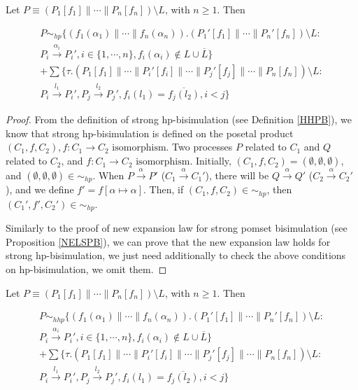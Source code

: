 \begin{proposition}\label{NELSHPB}
Let $P\equiv (P_1[f_1]\parallel\cdots\parallel P_n[f_n])\setminus L$, with $n\geq 1$. Then

\begin{eqnarray}
P\sim_{hp} \{(f_1(\alpha_1)\parallel\cdots\parallel f_n(\alpha_n)).(P_1'[f_1]\parallel\cdots\parallel P_n'[f_n])\setminus L: \nonumber\\
P_i\xrightarrow{\alpha_i}P_i',i\in\{1,\cdots,n\},f_i(\alpha_i)\notin L\cup\overline{L}\} \nonumber\\
+\sum\{\tau.(P_1[f_1]\parallel\cdots\parallel P_i'[f_i]\parallel\cdots\parallel P_j'[f_j]\parallel\cdots\parallel P_n[f_n])\setminus L: \nonumber\\
P_i\xrightarrow{l_1}P_i',P_j\xrightarrow{l_2}P_j',f_i(l_1)=\overline{f_j(l_2)},i<j\} \nonumber
\end{eqnarray}
\end{proposition}

\begin{proof}
From the definition of strong hp-bisimulation (see Definition \ref{HHPB}), we know that strong hp-bisimulation is defined on the posetal product $(C_1,f,C_2),f:C_1\rightarrow C_2\textrm{ isomorphism}$. Two processes $P$ related to $C_1$ and $Q$ related to $C_2$, and $f:C_1\rightarrow C_2\textrm{ isomorphism}$. Initially, $(C_1,f,C_2)=(\emptyset,\emptyset,\emptyset)$, and $(\emptyset,\emptyset,\emptyset)\in\sim_{hp}$. When $P\xrightarrow{\alpha}P'$ ($C_1\xrightarrow{\alpha}C_1'$), there will be $Q\xrightarrow{\alpha}Q'$ ($C_2\xrightarrow{\alpha}C_2'$), and we define $f'=f[\alpha\mapsto \alpha]$. Then, if $(C_1,f,C_2)\in\sim_{hp}$, then $(C_1',f',C_2')\in\sim_{hp}$.

Similarly to the proof of new expansion law for strong pomset bisimulation (see Proposition \ref{NELSPB}), we can prove that the new expansion law holds for strong hp-bisimulation, we just need additionally to check the above conditions on hp-bisimulation, we omit them.
\end{proof}

\begin{proposition}\label{NELSHHPB}
Let $P\equiv (P_1[f_1]\parallel\cdots\parallel P_n[f_n])\setminus L$, with $n\geq 1$. Then

\begin{eqnarray}
P\sim_{hhp} \{(f_1(\alpha_1)\parallel\cdots\parallel f_n(\alpha_n)).(P_1'[f_1]\parallel\cdots\parallel P_n'[f_n])\setminus L: \nonumber\\
P_i\xrightarrow{\alpha_i}P_i',i\in\{1,\cdots,n\},f_i(\alpha_i)\notin L\cup\overline{L}\} \nonumber\\
+\sum\{\tau.(P_1[f_1]\parallel\cdots\parallel P_i'[f_i]\parallel\cdots\parallel P_j'[f_j]\parallel\cdots\parallel P_n[f_n])\setminus L: \nonumber\\
P_i\xrightarrow{l_1}P_i',P_j\xrightarrow{l_2}P_j',f_i(l_1)=\overline{f_j(l_2)},i<j\} \nonumber
\end{eqnarray}
\end{proposition}

